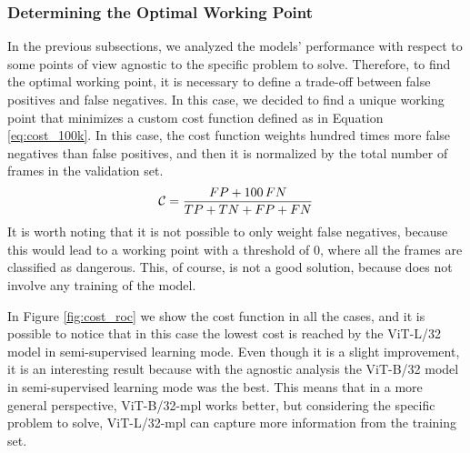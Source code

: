 \subsubsection{Determining the Optimal Working Point}
In the previous subsections, we analyzed the models' performance with respect to 
some points of view agnostic to the specific problem to solve. Therefore, to find 
the optimal working point, it is necessary to define a trade-off between false 
positives and false negatives. In this case, we decided to find a unique working 
point that minimizes a custom cost function defined as in Equation \ref{eq:cost_100k}.
In this case, the cost function weights hundred times more false negatives than 
false positives, and then it is normalized by the total number of frames in the 
validation set.
\begin{equation}
    \centering
    \mathcal{C} = \frac{FP + 100 \, FN}{TP + TN + FP + FN}
    \label{eq:cost_100k}
\end{equation}
It is worth noting that it is not possible to only weight false negatives, because 
this would lead to a working point with a threshold of 0, where all the frames 
are classified as dangerous. This, of course, is not a good solution, because 
does not involve any training of the model.

In Figure \ref{fig:cost_roc} we show the cost function in all the cases, and it 
is possible to notice that in this case the lowest cost is reached by the ViT-L/32 
model in semi-supervised learning mode. Even though it is a slight improvement, 
it is an interesting result because with the agnostic analysis the ViT-B/32 model 
in semi-supervised learning mode was the best. This means that in a more general 
perspective, ViT-B/32-\acs{mpl} works better, but considering the specific problem 
to solve, ViT-L/32-\acs{mpl} can capture more information from the training set.

